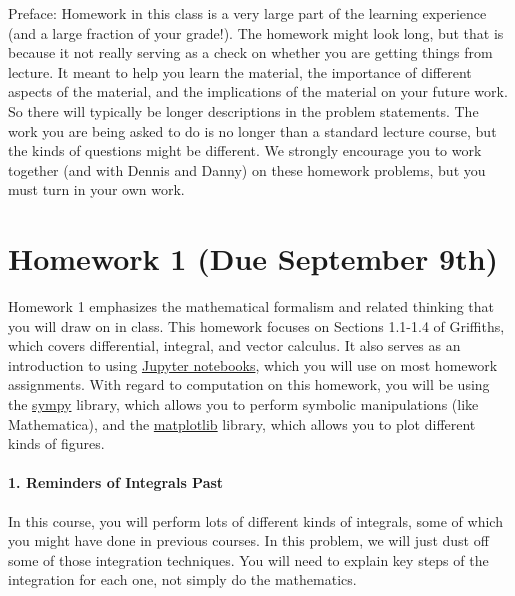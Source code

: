 \documentclass[11pt]{article}
\begin{document}
Preface: Homework in this class is a very large part of the learning
experience (and a large fraction of your grade!). The homework might
look long, but that is because it not really serving as a check on
whether you are getting things from lecture. It meant to help you learn
the material, the importance of different aspects of the material, and
the implications of the material on your future work. So there will
typically be longer descriptions in the problem statements. The work you
are being asked to do is no longer than a standard lecture course, but
the kinds of questions might be different. We strongly encourage you to
work together (and with Dennis and Danny) on these homework problems,
but you must turn in your own work.

\section{Homework 1 (Due September
9th)}\label{homework-1-due-september-9th}

Homework 1 emphasizes the mathematical formalism and related thinking
that you will draw on in class. This homework focuses on Sections
1.1-1.4 of Griffiths, which covers differential, integral, and vector
calculus. It also serves as an introduction to using
\href{http://jupyter.org}{Jupyter notebooks}, which you will use on most
homework assignments. With regard to computation on this homework, you
will be using the \href{http://sympy.org}{sympy} library, which allows
you to perform symbolic manipulations (like Mathematica), and the
\href{http://matplotlib.org/}{matplotlib} library, which allows you to
plot different kinds of figures.

\paragraph{1. Reminders of Integrals
Past}\label{reminders-of-integrals-past}

In this course, you will perform lots of different kinds of integrals,
some of which you might have done in previous courses. In this problem,
we will just dust off some of those integration techniques. You will
need to explain key steps of the integration for each one, not simply do
the mathematics.
\end{document}
